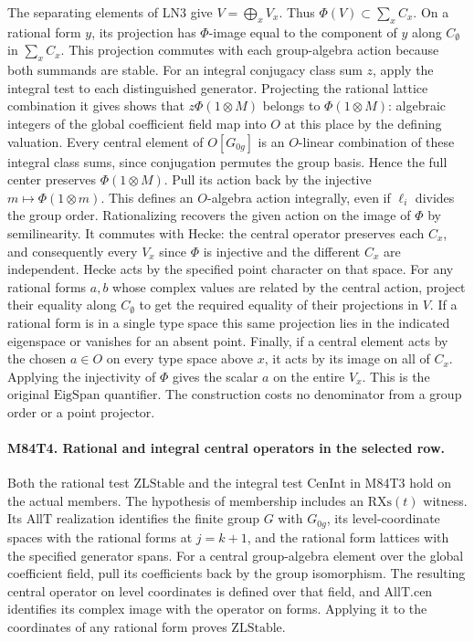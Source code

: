 The separating elements of LN3 give $V=\bigoplus_x V_x$.
Thus $\Phi(V)\subset\sum_x C_x$. On a rational form $y$, its
projection has $\Phi$-image equal to the component of $y$ along
$C_\emptyset$ in $\sum_x C_x$. This projection commutes with
each group-algebra action because both summands are stable. For
an integral conjugacy class sum $z$, apply the integral test to
each distinguished generator. Projecting the rational lattice
combination it gives shows that $z\Phi(1\otimes M)$ belongs to
$\Phi(1\otimes M)$: algebraic integers of the global coefficient
field map into $O$ at this place by the defining valuation.
Every central element of $O[G_{0g}]$ is an $O$-linear combination
of these integral class sums, since conjugation permutes the
group basis. Hence the full center preserves $\Phi(1\otimes M)$.
Pull its action back by the injective $m\mapsto\Phi(1\otimes m)$.
This defines an $O$-algebra action integrally, even if $\ell_i$
divides the group order. Rationalizing recovers the given action
on the image of $\Phi$ by semilinearity. It commutes with Hecke:
the central operator preserves each $C_x$, and consequently every
$V_x$ since $\Phi$ is injective and the different $C_x$ are
independent. Hecke acts by the specified point character on that
space. For any rational forms $a,b$ whose complex values are
related by the central action, project their equality along
$C_\emptyset$ to get the required equality of their projections
in $V$. If a rational form is in a single type space this same
projection lies in the indicated eigenspace or vanishes for an
absent point. Finally, if a central element acts by the chosen
$a\in O$ on every type space above $x$, it acts by its image on
all of $C_x$. Applying the injectivity of $\Phi$ gives the scalar
$a$ on the entire $V_x$. This is the original $\mathrm{EigSpan}$
quantifier. The construction costs no denominator from a group
order or a point projector.

\paragraph{M84T4. Rational and integral central operators in the selected row.}
Both the rational test $\mathrm{ZLStable}$ and the integral test
$\mathrm{CenInt}$ in M84T3 hold on the actual members. The
hypothesis of membership includes an $\mathrm{RXs}(t)$
witness. Its $\mathrm{AllT}$ realization identifies the finite
group $G$ with $G_{0g}$, its level-coordinate spaces with the
rational forms at $j=k+1$, and the rational form lattices with
the specified generator spans. For a central group-algebra
element over the global coefficient field, pull its coefficients
back by the group isomorphism. The resulting central operator
on level coordinates is defined over that field, and
$\mathrm{AllT}.\mathrm{cen}$ identifies its complex image with
the operator on forms. Applying it to the coordinates of any
rational form proves $\mathrm{ZLStable}$.

